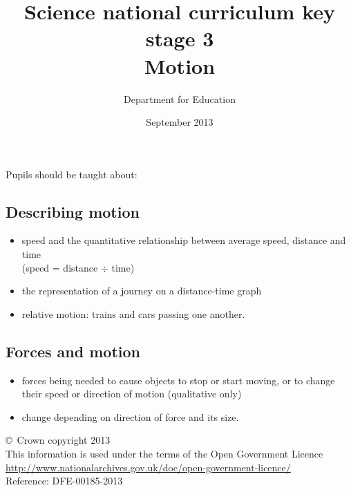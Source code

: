 \documentclass[a4paper,12pt]{article}
\begin{document}
\setcounter{secnumdepth}{0}

\title{Science national curriculum key stage 3\\Motion}
\author{Department for Education}
\date{September 2013}
\maketitle

\thispagestyle{empty}

Pupils should be taught about:

\subsection{Describing motion}
\begin{itemize}
\item speed and the quantitative relationship between average speed, distance and time\\
(speed = distance $\div$ time)
\item the representation of a journey on a distance-time graph
\item relative motion: trains and cars passing one another.
\end{itemize}
\subsection{Forces and motion}
\begin{itemize}
\item forces being needed to cause objects to stop or start moving, or to change their speed
or direction of motion (qualitative only)
\item change depending on direction of force and its size.
\end{itemize}

\vfill

\footnotesize
\noindent \copyright\ Crown copyright 2013\\
This information is used under the terms of the Open Government Licence\\
\url{http://www.nationalarchives.gov.uk/doc/open-government-licence/}\\
{\tiny Reference: DFE-00185-2013}
\end{document}
